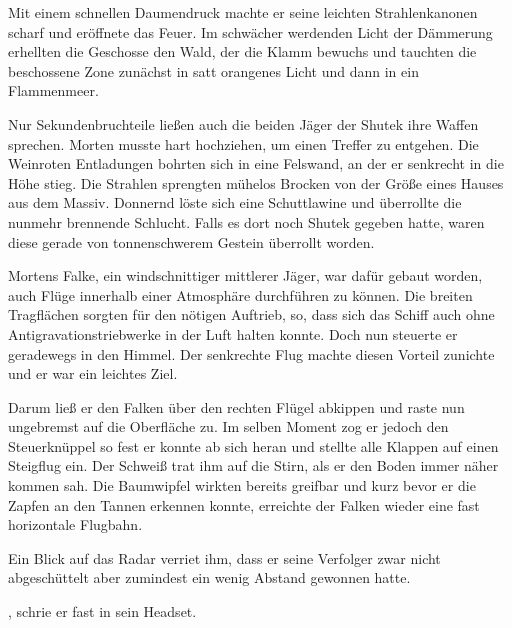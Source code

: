 Mit einem schnellen Daumendruck machte er seine leichten Strahlenkanonen scharf und eröffnete das Feuer. Im schwächer werdenden Licht der Dämmerung erhellten die Geschosse den Wald, der die Klamm bewuchs und tauchten die beschossene Zone zunächst in satt orangenes Licht und dann in ein Flammenmeer.

\par

Nur Sekundenbruchteile ließen auch die beiden Jäger der Shutek ihre Waffen sprechen. Morten musste hart hochziehen, um einen Treffer zu entgehen. Die Weinroten Entladungen bohrten sich in eine Felswand, an der er senkrecht in die Höhe stieg. Die Strahlen sprengten mühelos Brocken von der Größe eines Hauses aus dem Massiv. Donnernd löste sich eine Schuttlawine und überrollte die nunmehr brennende Schlucht. Falls es dort noch Shutek gegeben hatte, waren diese gerade von tonnenschwerem Gestein überrollt worden.

\par

Mortens Falke, ein windschnittiger mittlerer Jäger, war dafür gebaut worden, auch Flüge innerhalb einer Atmosphäre durchführen zu können. Die breiten Tragflächen sorgten für den nötigen Auftrieb, so, dass sich das Schiff auch ohne Antigravationstriebwerke in der Luft halten konnte. Doch nun steuerte er geradewegs in den Himmel. Der senkrechte Flug machte diesen Vorteil zunichte und er war ein leichtes Ziel.

\par

Darum ließ er den Falken über den rechten Flügel abkippen und raste nun ungebremst auf die Oberfläche zu. Im selben Moment zog er jedoch den Steuerknüppel so fest er konnte ab sich heran und stellte alle Klappen auf einen Steigflug ein. Der Schweiß trat ihm auf die Stirn, als er den Boden immer näher kommen sah. Die Baumwipfel wirkten bereits greifbar und kurz bevor er die Zapfen an den Tannen erkennen konnte, erreichte der Falken wieder eine fast horizontale Flugbahn.

\par

Ein Blick auf das Radar verriet ihm, dass er seine Verfolger zwar nicht abgeschüttelt aber zumindest ein wenig Abstand gewonnen hatte.

\par

, schrie er fast in sein Headset. 


